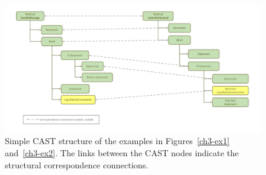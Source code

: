 \begin{figure}
\centering\includegraphics [width = \textwidth, height=0.5\textheight]{Drawing4/FirstCorr.pdf}
  \caption[Simple CAST structure of the examples in Figures~\ref{ch3-ex1} and~\ref{ch3-ex2}.]{Simple CAST structure of the examples in Figures~\ref{ch3-ex1} and~\ref{ch3-ex2}. The links between the CAST nodes indicate the structural correspondence connections.}
  \label{fig:meth-ast-1}
\end{figure}


